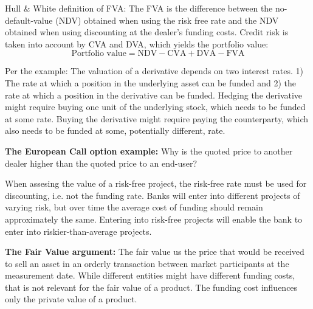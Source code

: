 \documentclass[10pt,a4paper]{article}
\begin{document}
            Hull \& White definition of FVA: The FVA is the difference between the no-default-value (NDV) obtained when using the risk free rate and the NDV obtained when using discounting at the dealer's funding costs. Credit risk is taken into account by CVA and DVA, which yields the portfolio value:
            \begin{equation}
                \text{Portfolio value} = \text{NDV} - \text{CVA} + \text{DVA} - \text{FVA}
            \end{equation}

            Per the example: The valuation of a derivative depends on two interest rates. 1) The rate at which a position in the underlying asset can be funded and 2) the rate at which a position in the derivative can be funded. Hedging the derivative might require buying one unit of the underlying stock, which needs to be funded at some rate. Buying the derivative might require paying the counterparty, which also needs to be funded at some, potentially different, rate.
            
            \textbf{The European Call option example:} Why is the quoted price to another dealer higher than the quoted price to an end-user?
            
            When assesing the value of a risk-free project, the risk-free rate must be used for discounting, i.e. not the funding rate. Banks will enter into different projects of varying risk, but over time the average cost of funding should remain approximately the same. Entering into risk-free projects will enable the bank to enter into riskier-than-average projects.
            
            \textbf{The Fair Value argument:} The fair value us the price that would be received to sell an asset in an orderly transaction between market participants at the measurement date. While different entities might have different funding costs, that is not relevant for the fair value of a product. The funding cost influences only the private value of a product.
\end{document}
